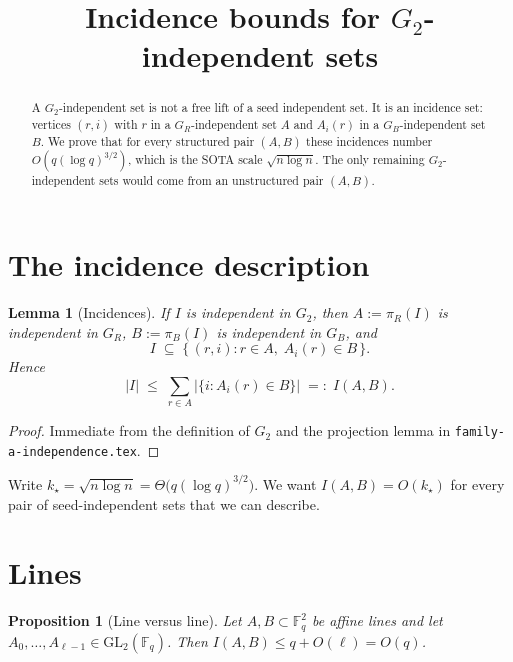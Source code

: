 \documentclass[11pt]{article}
\title{Incidence bounds for $G_2$-independent sets}
\date{}
\newtheorem{lemma}[theorem]{Lemma}
\newtheorem{proposition}[theorem]{Proposition}
\theoremstyle{definition}
\newcommand{\F}{\mathbb{F}}
\begin{document}
\maketitle

\begin{abstract}
A $G_2$-independent set is not a free lift of a seed independent set.
It is an incidence set: vertices $(r,i)$ with $r$ in a $G_R$-independent set $A$ and $A_i(r)$ in a $G_B$-independent set $B$.
We prove that for every structured pair $(A,B)$ these incidences number $O(q(\log q)^{3/2})$, which is the SOTA scale $\sqrt{n\log n}$.
The only remaining $G_2$-independent sets would come from an unstructured pair $(A,B)$.
\end{abstract}

\section{The incidence description}

\begin{lemma}[Incidences]\label{lem:inc}
If $I$ is independent in $G_2$, then $A:=\pi_R(I)$ is independent in $G_R$, $B:=\pi_B(I)$ is independent in $G_B$, and
\[
  I\;\subseteq\;
  \bigl\{\,(r,i):r\in A,\; A_i(r)\in B\,\bigr\}.
\]
Hence
\[
  |I|
  \;\le\;
  \sum_{r\in A}
  \bigl|\{i:A_i(r)\in B\}\bigr|
  \;=:\;
  I(A,B).
\]
\end{lemma}

\begin{proof}
Immediate from the definition of $G_2$ and the projection lemma in \texttt{family-a-independence.tex}.
\end{proof}

Write $k_{\star}=\sqrt{n\log n}=\Theta\bigl(q(\log q)^{3/2}\bigr)$.
We want $I(A,B)=O(k_{\star})$ for every pair of seed-independent sets that we can describe.

\section{Lines}

\begin{proposition}[Line versus line]\label{prop:LL}
Let $A,B\subset\F_q^{2}$ be affine lines and let $A_0,\dots,A_{\ell-1}\in\mathrm{GL}_2(\F_q)$.
Then $I(A,B)\le q+O(\ell)=O(q)$.
\end{proposition}
\end{document}
